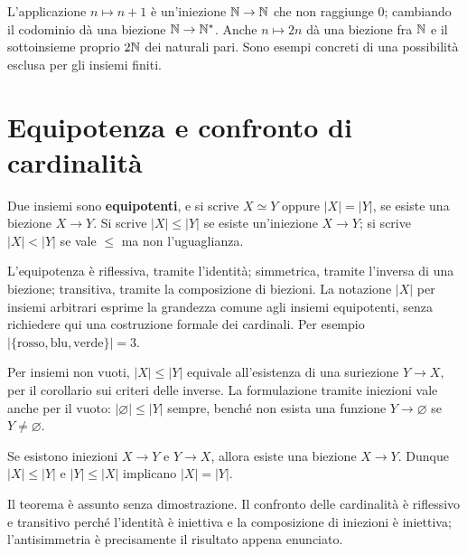 \begin{schema}
\end{schema}

\begin{esempio}
L'applicazione $n\mapsto n+1$ è un'iniezione $\mathbb{N}\to\mathbb{N}$ che non raggiunge $0$; cambiando il codominio dà una biezione $\mathbb{N}\to\mathbb{N}^*$. Anche $n\mapsto2n$ dà una biezione fra $\mathbb{N}$ e il sottoinsieme proprio $2\mathbb{N}$ dei naturali pari. Sono esempi concreti di una possibilità esclusa per gli insiemi finiti.
\end{esempio}

\section{Equipotenza e confronto di cardinalità}
\begin{definizione}
Due insiemi sono \textbf{equipotenti}, e si scrive $X\simeq Y$ oppure $|X|=|Y|$, se esiste una biezione $X\to Y$. Si scrive $|X|\le|Y|$ se esiste un'iniezione $X\to Y$; si scrive $|X|<|Y|$ se vale $\le$ ma non l'uguaglianza.
\end{definizione}

L'equipotenza è riflessiva, tramite l'identità; simmetrica, tramite l'inversa di una biezione; transitiva, tramite la composizione di biezioni. La notazione $|X|$ per insiemi arbitrari esprime la grandezza comune agli insiemi equipotenti, senza richiedere qui una costruzione formale dei cardinali. Per esempio $|\{\text{rosso},\text{blu},\text{verde}\}|=3$.

Per insiemi non vuoti, $|X|\le|Y|$ equivale all'esistenza di una suriezione $Y\to X$, per il corollario sui criteri delle inverse. La formulazione tramite iniezioni vale anche per il vuoto: $|\varnothing|\le|Y|$ sempre, benché non esista una funzione $Y\to\varnothing$ se $Y\ne\varnothing$.

\begin{teorema}\label{teo:csb}
Se esistono iniezioni $X\to Y$ e $Y\to X$, allora esiste una biezione $X\to Y$. Dunque $|X|\le|Y|$ e $|Y|\le|X|$ implicano $|X|=|Y|$.
\end{teorema}
Il teorema è assunto senza dimostrazione. Il confronto delle cardinalità è riflessivo e transitivo perché l'identità è iniettiva e la composizione di iniezioni è iniettiva; l'antisimmetria è precisamente il risultato appena enunciato.

